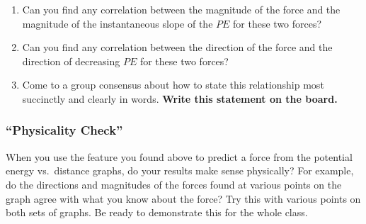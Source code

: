 \begin{enumerate}
	\item Can you find any correlation between the magnitude of the force and the magnitude of the instantaneous slope of the $PE$ for these two forces?
	
	\item Can you find any correlation between the direction of the force and the direction of decreasing $PE$ for these two forces?
	
	\item Come to a group consensus about how to state this relationship most succinctly and clearly in words. \textbf{Write this statement on the board.}
\end{enumerate}

\subsubsection*{``Physicality Check''}

When you use the feature you found above to predict a force from the potential energy vs.\ distance graphs, do your results make sense physically?  For example, do the directions and magnitudes of the forces found at various points on the graph agree with what you know about the force?  Try this with various points on both sets of graphs. Be ready to demonstrate this for the whole class.\\

\WCD
